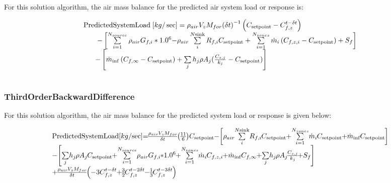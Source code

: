 For this solution algorithm, the air mass balance for the predicted air system load or response is:

\begin{equation}
\begin{array}{l}{\rm{PredictedSystemLoad}}\;[kg/\sec ] = {\rho_{air}}{V_z}{M_{for}}{\left( {\delta t} \right)^{ - 1}}\left( {{C_{{\rm{setpoint}}}} - C_{f,z}^{t - \delta t}} \right)\\\;\;\;\;\;\;\; - \left[ {\sum\limits_{i = 1}^{{N_{source}}} {{\rho_{air}}{G_{f,i}}*{{1.0}^6} - } {\rho_{air}}\sum\limits_i^{N{\rm{sink}}} {{R_{f,i}}{C_{{\rm{setpoint}}}}}  + \sum\limits_{i = 1}^{{N_{zones}}} {{{\dot m}_i}} \left( {{C_{f,z,i}} - {C_{{\rm{setpoint}}}}} \right) + {S_f}} \right]\\\;\;\;\;\;\; - \left[ {{{\dot m}_{\inf }}\left( {{C_{f,\infty }} - {C_{{\rm{setpoint}}}}} \right) + \sum\limits_j {{h_j}\rho {A_j}(\frac{{{C_{s,j}}}}{{{k_j}}} - {C_{{\rm{setpoint}}}})} } \right]\;\\\;\;\;\;\;\;\;\;\;\;\;\;\;\;\;\;\end{array}
\end{equation}

\subsubsection{ThirdOrderBackwardDifference}\label{thirdorderbackwarddifference-000}

For this solution algorithm, the air mass balance for the predicted system load or response is given below:

{\scriptsize
\begin{equation}
\medmuskip=0mu
\thinmuskip=0mu
\thickmuskip=0mu
\nulldelimiterspace=0pt
\scriptspace=0pt
\begin{array}{l}{\rm{PredictedSystemLoad}}\;[kg/\sec ] = \frac{{{\rho_{air}}{V_z}{M_{for}}}}{{\delta t}}\left( {\frac{{11}}{6}} \right){C_{{\rm{setpoint}}}} - \left[ {{\rho_{air}}\sum\limits_i^{N{\rm{sink}}} {{R_{f,i}}{C_{{\rm{setpoint}}}}}  + \sum\limits_{i = 1}^{{N_{zones}}} {{{\dot m}_i}} {C_{{\rm{setpoint}}}} + {{\dot m}_{\inf }}{C_{{\rm{setpoint}}}}} \right]\\\;\;\;\;\;\;\;\;\;\;\;\;\;\;\; - \left[ {\sum\limits_j {{h_j}\rho {A_j}{C_{{\rm{setpoint}}}}}  + \sum\limits_{i = 1}^{{N_{source}}} {{\rho_{air}}{G_{f,i}}*{{1.0}^6}}  + \sum\limits_{i = 1}^{{N_{zones}}} {{{\dot m}_i}} {C_{f,z,i}} + {{\dot m}_{\inf }}{C_{f,\infty }} + \sum\limits_j {{h_j}\rho {A_j}\frac{{{C_{s,j}}}}{{{k_j}}} + {S_f}} } \right]\\\;\;\;\;\;\;\;\;\;\;\;\;\;\;\; + \frac{{{\rho_{air}}{V_z}{M_{for}}}}{{\delta t}}\left( { - 3C_{f,z}^{t - \delta t} + \frac{3}{2}C_{f,z}^{t - 2\delta t} - \frac{1}{3}C_{f,z}^{t - 3\delta t}} \right)\end{array}
\end{equation}}

